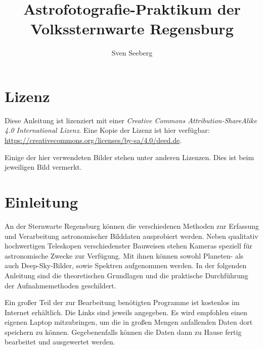 \documentclass[10pt,a4paper,titlepage]{article}
\begin{document}
\begin{titlepage}
\author[1]{Sven Seeberg}
\title{Astrofotografie-Praktikum der Volkssternwarte Regensburg}
\end{titlepage}
\maketitle

\tableofcontents
\section{Lizenz}
Diese Anleitung ist lizenziert mit einer \textit{Creative Commons Attribution-ShareAlike 4.0 International Lizenz}. Eine Kopie der Lizenz ist hier verfügbar: \url{https://creativecommons.org/licenses/by-sa/4.0/deed.de}.

Einige der hier verwendeten Bilder stehen unter anderen Lizenzen. Dies ist beim jeweiligen Bild vermerkt.


\section{Einleitung}
An der Sternwarte Regensburg können die verschiedenen Methoden zur Erfassung und Verarbeitung astronomischer Bilddaten ausprobiert werden. Neben qualitativ hochwertigen Teleskopen verschiedenster Bauweisen stehen Kameras speziell für astronomische Zwecke zur Verfügung. Mit ihnen können sowohl Planeten- als auch Deep-Sky-Bilder, sowie Spektren aufgenommen werden. In der folgenden Anleitung sind die theoretischen Grundlagen und die praktische Durchführung der Aufnahmemethoden geschildert.

Ein großer Teil der zur Bearbeitung benötigten Programme ist kostenlos im Internet erhältlich. Die Links sind jeweils angegeben. Es wird empfohlen einen eigenen Laptop mitzubringen, um die in großen Mengen anfallenden Daten dort speichern zu können. Gegebenenfalls können die Daten dann zu Hause fertig bearbeitet und ausgewertet werden.
\end{document}
